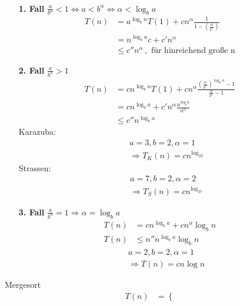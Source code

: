 {\\[.5em]
\begin{itemize}
\item[\textbf{1. Fall}]$\frac{a}{b^\alpha}<1\Leftrightarrow a<b^\alpha \Leftrightarrow \alpha < \log_ba$
\begin{align*}
T(n)&=a^{\log_bn}T(1)+cn^\alpha\frac{1}{1-\left(\frac{a}{b^\alpha}\right)}\\
&= n^{\log_ba}c+c'n^\alpha\\
&\le c''n^\alpha \,,\,\, \mbox{für hinreichend große n}
\end{align*}
\item[\textbf{2. Fall}]$\frac{a}{b^\alpha}>1$
\begin{align*}
T(n)&=cn^{\log_ba}T(1)+cn^\alpha\frac{\left(\frac{a}{b^\alpha}\right)^{\log_bn}-1}{\frac{a}{b^\alpha}-1}\\
&=cn^{\log_ba}+c'n^\alpha\frac{n^{log_ba}}{n^\alpha}\\
&\le  c''n^{\log_ba}
\end{align*}
Karazuba:
\begin{align*}&&a=3,b=2,\alpha=1\\&&\Rightarrow T_K(n)=cn^{\log_23}\end{align*}
Strassen:
\begin{align*}&&a=7,b=2,\alpha=2\\&&\Rightarrow T_S(n)=cn^{\log_27}\end{align*}
\item[\textbf{3. Fall}]$\frac{a}{b^\alpha}=1 \Rightarrow \alpha = \log_ba$
\begin{align*}
T(n)&=cn^{\log_ba}+cn^\alpha\log_bn\\
T(n)&\le n''n^{\log_ba}\log_bn
\end{align*}
\begin{align*}
&&a=2,b=2,\alpha=1\\
&&\Rightarrow T(n)=cn\log n
\end{align*}
\end{itemize}
Mergesort
\begin{align*}
T(n)&=\left\{\begin{array}{ll}

\end{array}
\end{align*}}
